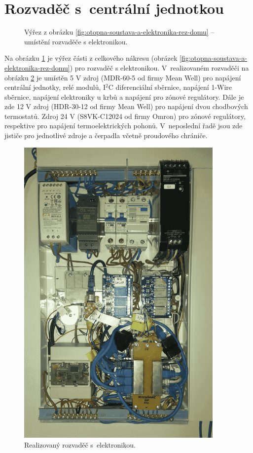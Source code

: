 \section{Rozvaděč s~centrální jednotkou}
\begin{figure}[H]
   \centering
   \def\svgwidth{0.5\columnwidth}
   
    \caption[Umístění rozvaděče s elektronikou.]{Výřez z obrázku \ref{fig:otopna-soustava-a-elektronika-rez-domu} – umístění rozvaděče s elektronikou.}
    \label{fig:vyrez-rozvadec}
\end{figure}

Na obrázku \ref{fig:vyrez-rozvadec} je výřez části z celkového nákresu (obrázek \ref{fig:otopna-soustava-a-elektronika-rez-domu}) pro rozvaděč s elektronikou. V~realizovaném rozvaděči na obrázku \ref{fig:rozvadec-ve-sklepe-s-elektronikou} je umístěn 5 V zdroj (MDR-60-5 \cite{mdr-60-5} od firmy Mean Well) pro napájení centrální jednotky, relé modulů, I$^2$C diferenciální sběrnice, napájení 1-Wire sběrnice, napájení elektroniky u krbů a napájení pro zónové regulátory. Dále je zde 12 V zdroj (HDR-30-12 \cite{hdr-30-12} od firmy Mean Well) pro napájení dvou chodbových termostatů. Zdroj 24 V (S8VK-C12024 \cite{s8vk-c12024} od firmy Omron) pro zónové regulátory, respektive pro napájení termoelektrických pohonů. V~neposlední řadě jsou zde jističe pro jednotlivé zdroje a čerpadla včetně proudového chrániče.

\begin{figure}[H]
    \centering
    \includegraphics[width=0.9\textwidth]{images/rozvadec-ve-sklepe-s-elektronikou.png}
    \caption{Realizovaný rozvaděč s~elektronikou.}
    \label{fig:rozvadec-ve-sklepe-s-elektronikou}
\end{figure}